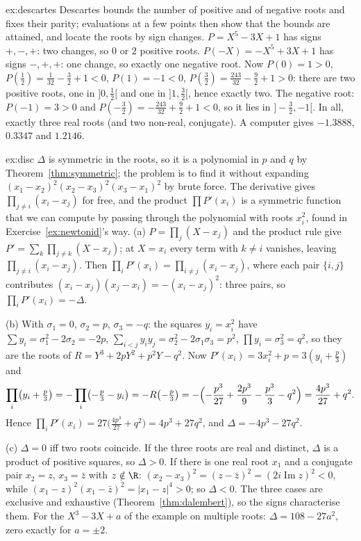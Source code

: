 \begin{solution}{ex:descartes}
\idea Descartes bounds the number of positive and of negative roots and fixes their parity; evaluations at a few points then show that the bounds are attained, and locate the roots by sign changes.
\writeup $P=X^5-3X+1$ has signs $+,-,+$: two changes, so $0$ or $2$ positive roots. $P(-X)=-X^5+3X+1$ has signs $-,+,+$: one change, so exactly one negative root. Now $P(0)=1>0$, $P(\frac12)=\frac1{32}-\frac32+1<0$, $P(1)=-1<0$, $P(\frac32)=\frac{243}{32}-\frac92+1>0$: there are two positive roots, one in $]0,\frac12[$ and one in $]1,\frac32[$, hence exactly two. The negative root: $P(-1)=3>0$ and $P(-\frac32)=-\frac{243}{32}+\frac92+1<0$, so it lies in $]-\frac32,-1[$. In all, exactly three real roots (and two non-real, conjugate). A computer gives $-1.3888$, $0.3347$ and $1.2146$.
\end{solution}

\begin{solution}{ex:disc}
\idea $\Delta$ is symmetric in the roots, so it is a polynomial in $p$ and $q$ by Theorem~\ref{thm:symmetric}; the problem is to find it without expanding $(x_1-x_2)^2(x_2-x_3)^2(x_3-x_1)^2$ by brute force. The derivative gives $\prod_{j\ne i}(x_i-x_j)$ for free, and the product $\prod P'(x_i)$ is a symmetric function that we can compute by passing through the polynomial with roots $x_i^2$, found in Exercise~\ref{ex:newtonid}'s way.
\writeup (a) $P=\prod_j(X-x_j)$ and the product rule give $P'=\sum_k\prod_{j\ne k}(X-x_j)$; at $X=x_i$ every term with $k\ne i$ vanishes, leaving $\prod_{j\ne i}(x_i-x_j)$. Then $\prod_iP'(x_i)=\prod_{i\ne j}(x_i-x_j)$, where each pair $\{i,j\}$ contributes $(x_i-x_j)(x_j-x_i)=-(x_i-x_j)^2$: three pairs, so $\prod_iP'(x_i)=-\Delta$.

(b) With $\sigma_1=0$, $\sigma_2=p$, $\sigma_3=-q$: the squares $y_i=x_i^2$ have $\sum y_i=\sigma_1^2-2\sigma_2=-2p$, $\sum_{i<j}y_iy_j=\sigma_2^2-2\sigma_1\sigma_3=p^2$, $\prod y_i=\sigma_3^2=q^2$, so they are the roots of $R=Y^3+2pY^2+p^2Y-q^2$. Now $P'(x_i)=3x_i^2+p=3(y_i+\frac p3)$ and
\[
\prod_i\bigl(y_i+\tfrac p3\bigr)=-\prod_i\bigl(-\tfrac p3-y_i\bigr)=-R\bigl(-\tfrac p3\bigr)=-\Bigl(-\frac{p^3}{27}+\frac{2p^3}9-\frac{p^3}3-q^2\Bigr)=\frac{4p^3}{27}+q^2.
\]
Hence $\prod_iP'(x_i)=27\bigl(\frac{4p^3}{27}+q^2\bigr)=4p^3+27q^2$, and $\Delta=-4p^3-27q^2$.

(c) $\Delta=0$ iff two roots coincide. If the three roots are real and distinct, $\Delta$ is a product of positive squares, so $\Delta>0$. If there is one real root $x_1$ and a conjugate pair $x_2=z$, $x_3=\bar z$ with $z\notin\R$: $(x_2-x_3)^2=(z-\bar z)^2=(2i\operatorname{Im}z)^2<0$, while $(x_1-z)^2(x_1-\bar z)^2=|x_1-z|^4>0$; so $\Delta<0$. The three cases are exclusive and exhaustive (Theorem~\ref{thm:dalembert}), so the signs characterise them. For the $X^3-3X+a$ of the example on multiple roots: $\Delta=108-27a^2$, zero exactly for $a=\pm2$.
\end{solution}

